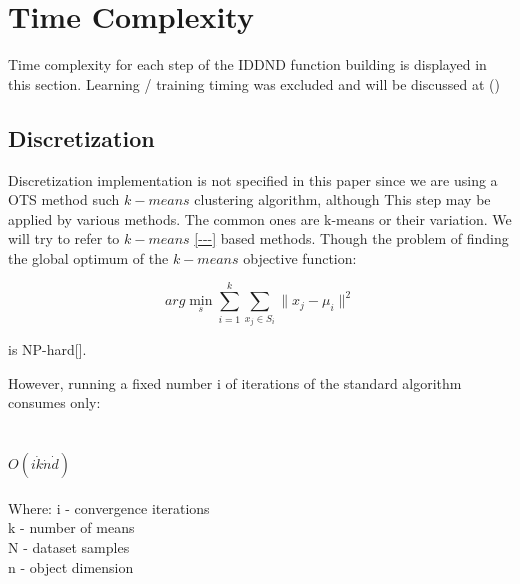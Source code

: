 
\chapter{Time Complexity} %

\label{Chapter6} %



Time complexity for each step of the IDDND function building is displayed in this section. 
Learning / training timing was excluded and will be discussed at ()


\section{Discretization}

	Discretization implementation is not specified in this paper since we are using a OTS method such $k-means$ clustering algorithm, although This step may be applied by various methods. 
	The common ones are k-means or their variation. We will try to refer to $k-means$ \ref{---} based methods.
	Though the problem of finding the global optimum of the $k-means$ objective function:
	
	\begin{equation}
	arg\min_s\sum_{i=1}^{k} \sum_{x_j \in S_i}^{}\|x_j - \mu_i \|^2
	\end{equation}
	
	is NP-hard[].
	
	However, running a fixed number i of iterations of the standard algorithm consumes only: \\ \\ \\
	\textbf{$O(i \dot k \dot n \dot d)$} \\ \\
	Where:
	i - convergence iterations \\
	k - number of means \\
	N - dataset samples \\
	n - object dimension \\
    
